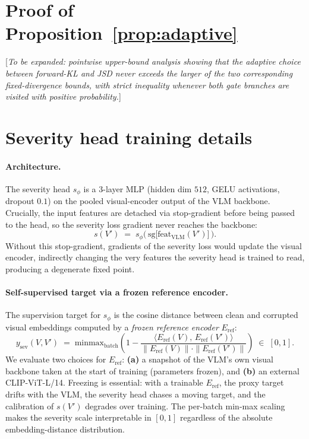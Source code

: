 \documentclass{article}
\begin{document}



\appendix

\section{Proof of Proposition~\ref{prop:adaptive}}
\label{app:prop}

[\emph{To be expanded: pointwise upper-bound analysis showing that the adaptive choice between forward-KL and JSD never exceeds the larger of the two corresponding fixed-divergence bounds, with strict inequality whenever both gate branches are visited with positive probability.}]

\section{Severity head training details}
\label{app:severity}

\paragraph{Architecture.}
The severity head $s_\phi$ is a 3-layer MLP (hidden dim $512$, GELU activations, dropout $0.1$) on the pooled visual-encoder output of the VLM backbone. Crucially, the input features are detached via stop-gradient before being passed to the head, so the severity loss gradient never reaches the backbone:
\[
   s(V') \;=\; s_\phi\!\big(\,\mathrm{sg}\big[\text{feat}_{\text{VLM}}(V')\big]\,\big).
\]
Without this stop-gradient, gradients of the severity loss would update the visual encoder, indirectly changing the very features the severity head is trained to read, producing a degenerate fixed point.

\paragraph{Self-supervised target via a frozen reference encoder.}
The supervision target for $s_\phi$ is the cosine distance between clean and corrupted visual embeddings computed by a \emph{frozen reference encoder} $E_{\text{ref}}$:
\[
   y_{\text{sev}}(V, V') \;=\; \text{minmax}_{\text{batch}}\!\left(1 - \frac{\langle E_{\text{ref}}(V),\, E_{\text{ref}}(V') \rangle}{\|E_{\text{ref}}(V)\| \cdot \|E_{\text{ref}}(V')\|}\right) \;\in\; [0,1].
\]
We evaluate two choices for $E_{\text{ref}}$: \textbf{(a)} a snapshot of the VLM's own visual backbone taken at the start of training (parameters frozen), and \textbf{(b)} an external CLIP-ViT-L/14. Freezing is essential: with a trainable $E_{\text{ref}}$, the proxy target drifts with the VLM, the severity head chases a moving target, and the calibration of $s(V')$ degrades over training. The per-batch min-max scaling makes the severity scale interpretable in $[0,1]$ regardless of the absolute embedding-distance distribution.
\end{document}
